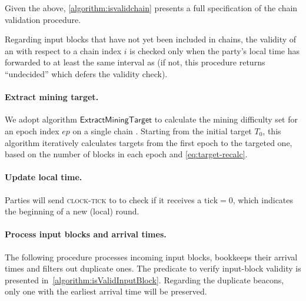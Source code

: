 Given the above, \cref{algorithm:isvalidchain} presents a full specification of the chain validation procedure.



Regarding input blocks that have not yet been included in chains, the validity of an  with respect to a chain index $i$ is checked only when the party's local time has forwarded to at least the same interval as  (if not, this procedure returns ``undecided'' which defers the validity check).



\paragraph{Extract mining target.}
%
We adopt algorithm $\mathsf{ExtractMiningTarget}$ to calculate the mining difficulty set for an epoch index $ep$ on a single chain \chain.
%
Starting from the initial target $T_0$, this algorithm iteratively calculates targets from the first epoch to the targeted one, based on the number of blocks in each epoch and \cref{eq:target-recalc}.



\paragraph{Update local time.}
%
Parties will send \textsc{clock-tick} to \funcDriftingClock to check if it receives a $\mathrm{tick} = 0$, which indicates the beginning of a new (local) round.



\paragraph{Process input blocks and arrival times.}
%
The following procedure processes incoming input blocks, bookkeeps their arrival times and filters out duplicate ones.
%
The predicate to verify input-block validity is presented in~\cref{algorithm:isValidInputBlock}.
%
Regarding the duplicate beacons, only one with the earliest arrival time will be preserved.



